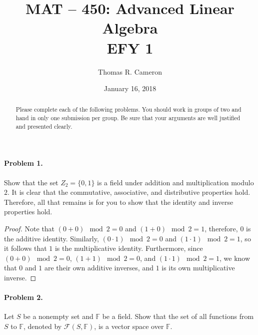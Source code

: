\documentclass{article}
\title{MAT -- 450: Advanced Linear Algebra\\
\large{EFY 1}}
\author{Thomas R. Cameron}
\date{January 16, 2018}
\begin{document}
\maketitle

\begin{abstract}
Please complete each of the following problems. You should work in groups of two and hand in only one submission per group. Be sure that your arguments are well justified and presented clearly. 
\end{abstract}

\paragraph*{Problem 1.}	Show that the set $Z_{2}=\{0,1\}$ is a field under addition and multiplication modulo $2$. It is clear that the commutative, associative, and distributive properties hold. Therefore, all that remains is for you to show that the identity and inverse properties hold. 

\begin{proof}
Note that $(0+0)\mod 2=0$ and $(1+0)\mod 2=1$, therefore, $0$ is the additive identity. Similarly, $(0\cdot 1)\mod 2=0$ and $(1\cdot 1)\mod 2=1$, so it follows that $1$ is the multiplicative identity. Furthermore, since $(0+0)\mod 2=0$, $(1+1)\mod 2=0$, and $(1\cdot 1)\mod 2=1$, we know that $0$ and $1$ are their own additive inverses, and $1$ is its own multiplicative inverse.
\end{proof}

\paragraph*{Problem 2.}	Let $S$ be a nonempty set and $\mathbb{F}$ be a field. Show that the set of all functions from $S$ to $\mathbb{F}$, denoted by $\mathcal{F}(S,\mathbb{F})$, is a vector space over $\mathbb{F}$.
\end{document}
